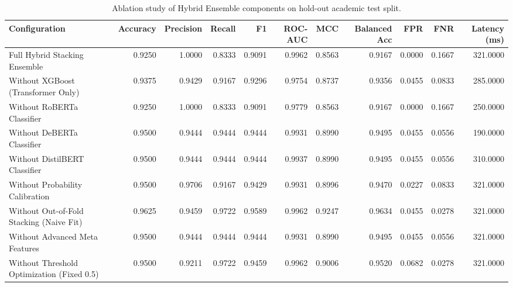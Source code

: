 \begin{table}
\caption{Ablation study of Hybrid Ensemble components on hold-out academic test split.}
\label{tab:ablation}
\begin{tabular}{lrrrrrrrrrr}
\toprule
Configuration & Accuracy & Precision & Recall & F1 & ROC-AUC & MCC & Balanced Acc & FPR & FNR & Latency (ms) \\
\midrule
Full Hybrid Stacking Ensemble & 0.9250 & 1.0000 & 0.8333 & 0.9091 & 0.9962 & 0.8563 & 0.9167 & 0.0000 & 0.1667 & 321.0000 \\
Without XGBoost (Transformer Only) & 0.9375 & 0.9429 & 0.9167 & 0.9296 & 0.9754 & 0.8737 & 0.9356 & 0.0455 & 0.0833 & 285.0000 \\
Without RoBERTa Classifier & 0.9250 & 1.0000 & 0.8333 & 0.9091 & 0.9779 & 0.8563 & 0.9167 & 0.0000 & 0.1667 & 250.0000 \\
Without DeBERTa Classifier & 0.9500 & 0.9444 & 0.9444 & 0.9444 & 0.9931 & 0.8990 & 0.9495 & 0.0455 & 0.0556 & 190.0000 \\
Without DistilBERT Classifier & 0.9500 & 0.9444 & 0.9444 & 0.9444 & 0.9937 & 0.8990 & 0.9495 & 0.0455 & 0.0556 & 310.0000 \\
Without Probability Calibration & 0.9500 & 0.9706 & 0.9167 & 0.9429 & 0.9931 & 0.8996 & 0.9470 & 0.0227 & 0.0833 & 321.0000 \\
Without Out-of-Fold Stacking (Naive Fit) & 0.9625 & 0.9459 & 0.9722 & 0.9589 & 0.9962 & 0.9247 & 0.9634 & 0.0455 & 0.0278 & 321.0000 \\
Without Advanced Meta Features & 0.9500 & 0.9444 & 0.9444 & 0.9444 & 0.9931 & 0.8990 & 0.9495 & 0.0455 & 0.0556 & 321.0000 \\
Without Threshold Optimization (Fixed 0.5) & 0.9500 & 0.9211 & 0.9722 & 0.9459 & 0.9962 & 0.9006 & 0.9520 & 0.0682 & 0.0278 & 321.0000 \\
\bottomrule
\end{tabular}
\end{table}
